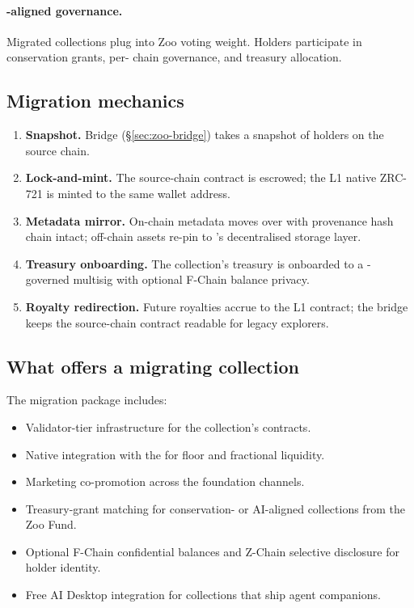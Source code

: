 \paragraph{\DAO{}-aligned governance.}
Migrated collections plug into Zoo \DAO{} voting weight. Holders
participate in conservation grants, per-\LLM{} chain governance, and
treasury allocation.

\subsection{Migration mechanics}

\begin{enumerate}[leftmargin=1.4em]
  \item \textbf{Snapshot.} \Zoo{} Bridge (\S\ref{sec:zoo-bridge}) takes a
        snapshot of holders on the source chain.
  \item \textbf{Lock-and-mint.} The source-chain contract is escrowed;
        the \Zoo{} L1 native ZRC-721 is minted to the same wallet
        address.
  \item \textbf{Metadata mirror.} On-chain metadata moves over with
        provenance hash chain intact; off-chain assets re-pin to
        \Zoo{}'s decentralised storage layer.
  \item \textbf{Treasury onboarding.} The collection's treasury is
        onboarded to a \Zoo{} \DAO{}-governed multisig with optional
        F-Chain \FHE{} balance privacy.
  \item \textbf{Royalty redirection.} Future royalties accrue to the
        L1 contract; the bridge keeps the source-chain contract
        readable for legacy explorers.
\end{enumerate}

\subsection{What \Zoo{} offers a migrating collection}

The migration package includes:

\begin{itemize}[leftmargin=1.2em]
  \item Validator-tier infrastructure for the collection's contracts.
  \item Native integration with the \Zoo{} \DEX{} for floor and
        fractional liquidity.
  \item Marketing co-promotion across the \Zoo{} foundation channels.
  \item Treasury-grant matching for conservation- or AI-aligned
        collections from the Zoo Fund.
  \item Optional F-Chain confidential balances and Z-Chain selective
        disclosure for holder identity.
  \item Free \Zoo{} AI Desktop integration for collections that ship
        agent companions.
\end{itemize}

